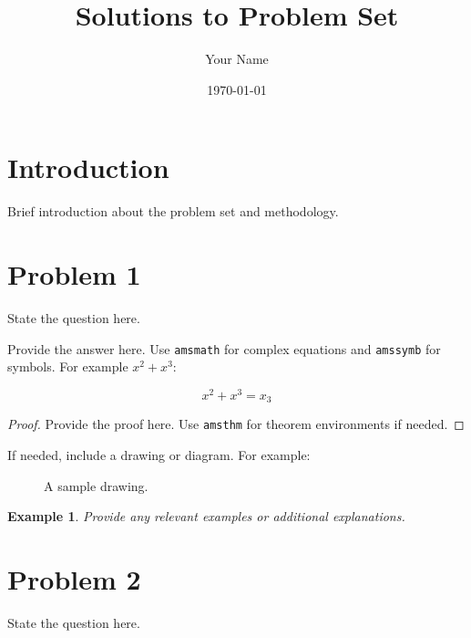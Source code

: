 \documentclass[12pt]{article}
\title{Solutions to Problem Set}
\author{Your Name}
\date{\today}
\newtheorem{example}[theorem]{Example}
\begin{document}
\maketitle

\section{Introduction}
Brief introduction about the problem set and methodology.

\section{Problem 1}
\begin{problem}
State the question here.
\end{problem}

\begin{answer}
Provide the answer here. Use \texttt{amsmath} for complex equations and \texttt{amssymb} for symbols. For example $x^2+x^3$:

\begin{equation}
    x^2+x^3 = x_3
\end{equation}

\end{answer}

\begin{proof}
Provide the proof here. Use \texttt{amsthm} for theorem environments if needed.
\end{proof}


\begin{drawing}
If needed, include a drawing or diagram. For example:
\begin{figure}[h!]
    \centering
    \caption{A sample drawing.}
    \label{fig:example-drawing}
\end{figure}
\end{drawing}

\begin{example}
Provide any relevant examples or additional explanations.
\end{example}

\section{Problem 2}
\begin{problem}
State the question here.
\end{problem}
\end{document}
